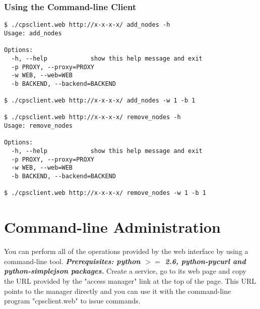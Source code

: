 \documentclass[12pt]{article}
\newenvironment{framedbox}[1]%
{\begin{framed}
 \begingroup
 \fontsize{#1}{#1}\selectfont
}
{
 \endgroup
 \end{framed}
}
\begin{document}
\subsubsection{Using the Command-line Client}
\begin{framedbox}{8pt}\begin{verbatim}
$ ./cpsclient.web http://x-x-x-x/ add_nodes -h
Usage: add_nodes

Options:
  -h, --help            show this help message and exit
  -p PROXY, --proxy=PROXY
  -w WEB, --web=WEB     
  -b BACKEND, --backend=BACKEND

$ ./cpsclient.web http://x-x-x-x/ add_nodes -w 1 -b 1

$ ./cpsclient.web http://x-x-x-x/ remove_nodes -h
Usage: remove_nodes

Options:
  -h, --help            show this help message and exit
  -p PROXY, --proxy=PROXY
  -w WEB, --web=WEB     
  -b BACKEND, --backend=BACKEND

$ ./cpsclient.web http://x-x-x-x/ remove_nodes -w 1 -b 1
\end{verbatim}\end{framedbox}

\section{Command-line Administration}
You can perform all of the operations provided by the web interface
by using a command-line tool. \textbf{\emph{Prerequisites: python $>=$ 2.6,
python-pycurl and python-simplejson packages.}}
Create a service, go to its web page and copy the URL provided by the 
"access manager" link at the top of the page. This URL points to the manager
directly and you can use it with the command-line program "cpsclient.web" to
issue commands.
\end{document}
